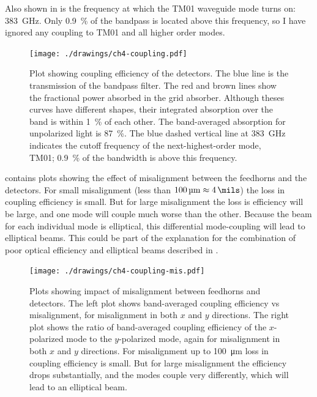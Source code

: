 Also shown in  is the frequency at which the TM01 waveguide mode turns on: \SI{383}{\GHz}.
Only \SI{0.9}{\percent} of the bandpass is located above this frequency, so I have ignored any coupling to TM01 and all higher order modes.

\begin{figure}
\centering
\texttt{[image: ./drawings/ch4-coupling.pdf]}
\caption[Detector coupling efficiency]{
  Plot showing coupling efficiency of the detectors.
  The blue line is the transmission of the bandpass filter.
  The red and brown lines show the fractional power absorbed in the grid absorber.
  Although theses curves have different shapes, their integrated absorption over the band is within \SI{1}{\percent} of each other.
  The band-averaged absorption for unpolarized light is \SI{87}{\percent}.
  The blue dashed vertical line at \SI{383}{\GHz} indicates the cutoff frequency of the next-highest-order mode, TM01; \SI{0.9}{\percent} of the bandwidth is above this frequency.
}
\label{fig:ch4-coupling}
\end{figure}

 contains plots showing the effect of misalignment between the feedhorns and the detectors.
For small misalignment (less than $\SI{100}{\um} \approx \SI{4}{\mils}$) the loss in coupling efficiency is small.
But for large misalignment the loss is efficiency will be large, and one mode will couple much worse than the other.
Because the beam for each individual mode is elliptical, this differential mode-coupling will lead to elliptical beams.
This could be part of the explanation for the combination of poor optical efficiency and elliptical beams described in .

\begin{figure}
\centering
\texttt{[image: ./drawings/ch4-coupling-mis.pdf]}
\caption[Feedhorn / detector misalignment]{
  Plots showing impact of misalignment between feedhorns and detectors.
  The left plot shows band-averaged coupling efficiency vs misalignment, for misalignment in both $x$ and $y$ directions.
  The right plot shows the ratio of band-averaged coupling efficiency of the $x$-polarized mode to the $y$-polarized mode, again for misalignment in both $x$ and $y$ directions.
  For misalignment up to \SI{100}{\um} loss in coupling efficiency is small.
  But for large misalignment the efficiency drops substantially, and the modes couple very differently, which will lead to an elliptical beam.
}
\label{fig:ch4-coupling-mis}
\end{figure}

